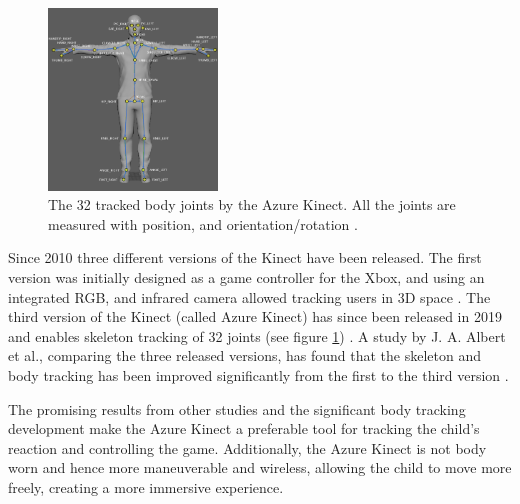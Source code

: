\begin{figure}[h]
    \centering
    \includegraphics[width = 0.4\textwidth]{SMC2022_template_Latex/images/joint-hierarchy.png}
    \caption{The 32 tracked body joints by the Azure Kinect. All the joints are measured with position, and orientation/rotation \cite{kinectImage}.}
    \label{fig:skeletonTracked}
\end{figure}

Since 2010 three different versions of the Kinect have been released. The first version was initially designed as a game controller for the Xbox, and using an integrated RGB, and infrared camera allowed tracking users in 3D space \cite{kinectVS}. The third version of the Kinect (called Azure Kinect) has since been released in 2019 and enables skeleton tracking of 32 joints (see figure \ref{fig:skeletonTracked}) \cite{kinectVS}. A study by J. A. Albert et al., comparing the three released versions, has found that the skeleton and body tracking has been improved significantly from the first to the third version \cite{kinectVS}. \newline

The promising results from other studies and the significant body tracking development make the Azure Kinect a preferable tool for tracking the child's reaction and controlling the game. Additionally, the Azure Kinect is not body worn and hence more maneuverable and wireless, allowing the child to move more freely, creating a more immersive experience. 